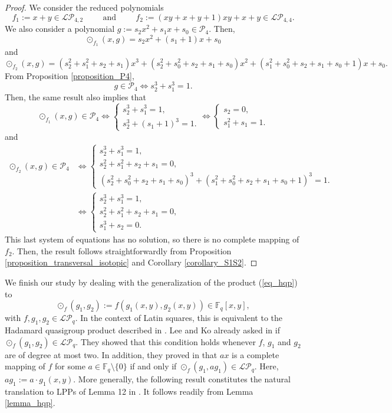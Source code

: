 \documentclass[pdflatex,sn-mathphys-num]{sn-jnl}
\theoremstyle{thmstyleone}%
\begin{document}
\begin{proof} We consider the reduced polynomials
\[f_1:=x+y\in\mathcal{LP}_{4,2} \hspace{1cm}\text{and}\hspace{1cm} f_2:=(xy+x+y+1)xy+x+y\in\mathcal{LP}_{4,4}.\]
We also consider a polynomial $g:=s_2x^2+s_1x+s_0\in\mathcal{P}_4$. Then, 
\[\odot_{f_1}(x,g)=s_2x^2+(s_1+1)x+s_0\]
and
\[\odot_{f_2}(x,g)=(s_2^2+s_1^2+s_2+s_1)x^3 + (s_2^2+s_0^2+s_2+s_1+s_0)x^2 + (s_1^2+s_0^2+s_2+s_1+s_0+1)x + s_0.\]
From Proposition \ref{proposition_P4},
\[g\in\mathcal{P}_4\Leftrightarrow s_2^3+s_1^3=1.\] 
Then, the same result also implies that
\[\odot_{f_1}(x,g)\in\mathcal{P}_4\Leftrightarrow 
\begin{cases}
s_2^3+s_1^3=1,\\
s_2^3+(s_1+1)^3=1.    
\end{cases}\Leftrightarrow 
\begin{cases}
s_2=0,\\
s_1^2+s_1=1.   
\end{cases}\]
and
\begin{align*}
 \odot_{f_2}(x,g)\in\mathcal{P}_4 & \Leftrightarrow \begin{cases}
s_2^3+s_1^3=1,\\
s_2^2+s_1^2+s_2+s_1=0,\\
(s_2^2+s_0^2+s_2+s_1+s_0)^3+(s_1^2+s_0^2+s_2+s_1+s_0+1)^3=1.
\end{cases}\\
 & \Leftrightarrow \begin{cases}
s_2^3+s_1^3=1,\\
s_2^2+s_1^2+s_2+s_1=0,\\
s_1^3+ s_2=0.
\end{cases}
\end{align*}
This last system of equations has no solution, so there is no complete mapping of $f_2$. Then, the result follows straightforwardly from Proposition \ref{proposition_transversal_isotopic} and Corollary \ref{corollary_S1S2}.
\end{proof}

\vspace{0.2cm}

We finish our study by dealing with the generalization of the product (\ref{eq_hqp}) to
\[\odot_f(g_1,g_2):=f(g_1(x,y),g_2(x,y))\in\mathbb{F}_q[x,y],\]
with $f,g_1,g_2\in\mathcal{LP}_q$. In the context of Latin squares, this is equivalent to the Hadamard quasigroup product described in \cite{Falcon2023}. Lee and Ko already asked in \cite{Lee1994} if $\odot_f(g_1,g_2)\in\mathcal{LP}_q$. They showed that this condition holds whenever $f$, $g_1$ and $g_2$ are of degree at most two. In addition, they proved in \cite[Theorem 8]{Lee1994} that $ax$ is a complete mapping of $f$ for some $a\in\mathbb{F}_q\setminus\{0\}$ if and only if $\odot_f(g_1,ag_1)\in\mathcal{LP}_q$. Here, $ag_1:=a\cdot g_1(x,y)$. More generally, the following result constitutes the natural translation to LPPs of Lemma 12 in \cite{Falcon2023}. It follows readily from Lemma \ref{lemma_hqp}.
\end{document}
